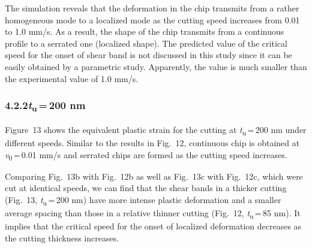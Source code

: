 \documentclass{article}
\begin{document}
The simulation reveals that the deformation in the chip transmits from a rather homogeneous mode to a localized mode as the cutting speed increases from 0.01 to 1.0 mm/s. As a result, the shape of the chip transmits from a continuous profile to a serrated one (localized shape). The predicted value of the critical speed for the onset of shear band is not discussed in this study since it can be easily obtained by a parametric study. Apparently, the value is much smaller than the experimental value of 1.0 mm/s.

\subsubsection*{4.2.2\quad \emph{t}\textsubscript{u}\,=\,200 nm}

Figure~13 shows the equivalent plastic strain for the cutting at \emph{t}\textsubscript{u}\,=\,200 nm under different speeds. Similar to the results in Fig.~12, continuous chip is obtained at \emph{v}\textsubscript{0}\,=\,0.01 mm/s and serrated chips are formed as the cutting speed increases.

Comparing Fig.~13b with Fig.~12b as well as Fig.~13c with Fig.~12c, which were cut at identical speeds, we can find that the shear bands in a thicker cutting (Fig.~13, \emph{t}\textsubscript{u}\,=\,200 nm) have more intense plastic deformation and a smaller average spacing than those in a relative thinner cutting (Fig.~12, \emph{t}\textsubscript{u}\,=\,85 nm). It implies that the critical speed for the onset of localized deformation decreases as the cutting thickness increases.
\end{document}
